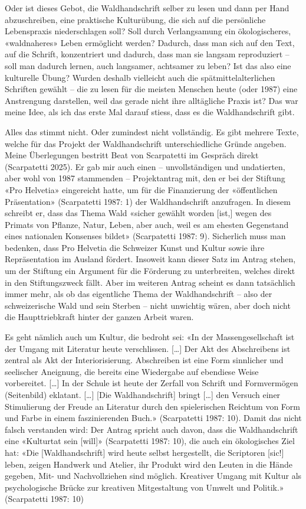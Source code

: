 \documentclass[a4paper,
fontsize=11pt,
oneside,
numbers=noperiodatend,
parskip=half-,
bibliography=totoc,
final
]{scrartcl}
\begin{document}
Oder ist dieses Gebot, die Waldhandschrift selber zu lesen und dann per
Hand abzuschreiben, eine praktische Kulturübung, die sich auf die
persönliche Lebenspraxis niederschlagen soll? Soll durch Verlangsamung
ein ökologischeres, «waldnaheres» Leben ermöglicht werden? Dadurch, dass
man sich auf den Text, auf die Schrift, konzentriert und dadurch, dass
man sie langsam reproduziert -- soll man dadurch lernen, auch langsamer,
achtsamer zu leben? Ist das also eine kulturelle Übung? Wurden deshalb
vielleicht auch die spätmittelalterlichen Schriften gewählt -- die zu
lesen für die meisten Menschen heute (oder 1987) eine Anstrengung
darstellen, weil das gerade nicht ihre alltägliche Praxis ist? Das war
meine Idee, als ich das erste Mal darauf stiess, dass es die
Waldhandschrift gibt.

Alles das stimmt nicht. Oder zumindest nicht vollständig. Es gibt
mehrere Texte, welche für das Projekt der Waldhandschrift
unterschiedliche Gründe angeben. Meine Überlegungen bestritt Beat von
Scarpatetti im Gespräch direkt (Scarpatetti 2025). Er gab mir auch einen
-- unvollständigen und undatierten, aber wohl von 1987 stammenden --
Projektantrag mit, den er bei der Stiftung «Pro Helvetia» eingereicht
hatte, um für die Finanzierung der «öffentlichen Präsentation»
(Scarpatetti 1987: 1) der Waldhandschrift anzufragen. In diesem schreibt
er, dass das Thema Wald «sicher gewählt worden {[}ist,{]} wegen des
Primats von Pflanze, Natur, Leben, aber auch, weil es am ehesten
Gegenstand eines nationalen Konsenses bildet» (Scarpatetti 1987: 9).
Sicherlich muss man bedenken, dass Pro Helvetia die Schweizer Kunst und
Kultur sowie ihre Repräsentation im Ausland fördert. Insoweit kann
dieser Satz im Antrag stehen, um der Stiftung ein Argument für die
Förderung zu unterbreiten, welches direkt in den Stiftungszweck fällt.
Aber im weiteren Antrag scheint es dann tatsächlich immer mehr, als ob
das eigentliche Thema der Waldhandschrift -- also der schweizerische
Wald und sein Sterben -- nicht unwichtig wären, aber doch nicht die
Haupttriebkraft hinter der ganzen Arbeit waren.

Es geht nämlich auch um Kultur, die bedroht sei: «In der
Massengesellschaft ist der Umgang mit Literatur heute verschlissen.
{[}\ldots{]} Der Akt des Abschreibens ist zentral als Akt der
Interiorisierung. Abschreiben ist eine Form sinnlicher und seelischer
Aneignung, die bereits eine Wiedergabe auf ebendiese Weise vorbereitet.
{[}\ldots{]} In der Schule ist heute der Zerfall von Schrift und
Formvermögen (Seitenbild) eklatant. {[}\ldots{]} {[}Die
Waldhandschrift{]} bringt {[}\ldots{]} den Versuch einer Stimulierung
der Freude an Literatur durch den spielerischen Reichtum von Form und
Farbe in einem faszinierenden Buch.» (Scarpatetti 1987: 10). Damit das
nicht falsch verstanden wird: Der Antrag spricht auch davon, dass die
Waldhandschrift eine «Kulturtat sein {[}will{]}» (Scarpatetti 1987: 10),
die auch ein ökologisches Ziel hat: «Die {[}Waldhandschrift{]} wird
heute selbst hergestellt, die Scriptoren {[}sic!{]} leben, zeigen
Handwerk und Atelier, ihr Produkt wird den Leuten in die Hände gegeben,
Mit- und Nachvollziehen sind möglich. Kreativer Umgang mit Kultur als
psychologische Brücke zur kreativen Mitgestaltung von Umwelt und
Politik.» (Scarpatetti 1987: 10)
\end{document}
